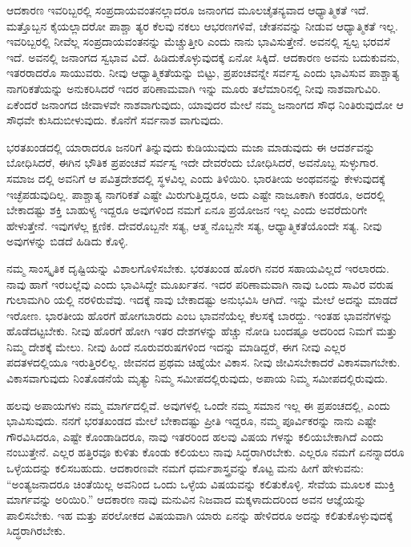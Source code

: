 ಆದಕಾರಣ ಇವರಿಬ್ಬರಲ್ಲಿ ಸಂಪ್ರದಾಯವಂತನಲ್ಲಾದರೂ ಜನಾಂಗದ ಮೂಲಚೈತನ್ಯವಾದ ಆಧ್ಯಾತ್ಮಿಕತೆ ಇದೆ. ಮತ್ತೊಬ್ಬನ ಕೈಯಲ್ಲಾದರೋ ಪಾಶ್ಚಾ ತ್ಯರ ಕೆಲವು ನಕಲು ಆಭರಣಗಳಿವೆ, ಚೇತನವನ್ನು ನೀಡುವ ಆಧ್ಯಾತ್ಮಿಕತೆ ಇಲ್ಲ. ಇವರಿಬ್ಬರಲ್ಲಿ ನೀವೆಲ್ಲ ಸಂಪ್ರದಾಯವಂತನನ್ನು ಮೆಚ್ಚುತ್ತೀರಿ ಎಂದು ನಾನು ಭಾವಿಸುತ್ತೇನೆ. ಅವನಲ್ಲಿ ಸ್ವಲ್ಪ ಭರವಸೆ ಇದೆ. ಅವನಲ್ಲಿ ಜನಾಂಗದ ಸ್ವಭಾವ ವಿದೆ. ಹಿಡಿದುಕೊಳ್ಳುವುದಕ್ಕೆ ಏನೋ ಸಿಕ್ಕಿದೆ. ಆದಕಾರಣ ಅವನು ಬದುಕುವನು, ಇತರರಾದರೊ ಸಾಯುವರು. ನೀವು ಆಧ್ಯಾತ್ಮಿಕತೆಯನ್ನು ಬಿಟ್ಟು, ಪ್ರಪಂಚವನ್ನೇ ಸರ್ವಸ್ವ ಎಂದು ಭಾವಿಸುವ ಪಾಶ್ಚಾತ್ಯ ನಾಗರಿಕತೆಯನ್ನು ಅನುಕರಿಸಿದರೆ ಇದರ ಪರಿಣಾಮವಾಗಿ ಇನ್ನು ಮೂರು ತಲೆಮಾರಿನಲ್ಲಿ ನೀವು ನಾಶವಾಗುವಿರಿ. ಏಕೆಂದರೆ ಜನಾಂಗದ ಜೀವಾಳವೇ ನಾಶವಾಗುವುದು, ಯಾವುದರ ಮೇಲೆ ನಮ್ಮ ಜನಾಂಗದ ಸೌಧ ನಿಂತಿರುವುದೋ ಆ ಸೌಧವೇ ಕುಸಿದುಬೀಳುವುದು. ಕೊನೆಗೆ ಸರ್ವನಾಶ ವಾಗುವುದು.

ಭರತಖಂಡದಲ್ಲಿ ಯಾರಾದರೂ ಜನರಿಗೆ ತಿನ್ನುವುದು ಕುಡಿಯುವುದು ಮಜಾ ಮಾಡುವುದು ಈ ಆದರ್ಶವನ್ನು ಬೋಧಿಸಿದರೆ, ಈಗಿನ ಭೌತಿಕ ಪ್ರಪಂಚವೆ ಸರ್ವಸ್ವ ಇದೇ ದೇವರೆಂದು ಬೋಧಿಸಿದರೆ, ಅವನೊಬ್ಬ ಸುಳ್ಳುಗಾರ. ಸಮಾಜ ದಲ್ಲಿ ಅವನಿಗೆ ಆ ಪವಿತ್ರದೇಶದಲ್ಲಿ ಸ್ಥಳವಿಲ್ಲ ಎಂದು ತಿಳಿಯಿರಿ. ಭಾರತೀಯ ಅಂಥವನನ್ನು ಕೇಳುವುದಕ್ಕೆ ಇಚ್ಛೆಪಡುವುದಿಲ್ಲ. ಪಾಶ್ಚಾತ್ಯ ನಾಗರಿಕತೆ ಎಷ್ಟೇ ಮಿರುಗುತ್ತಿದ್ದರೂ, ಅದು ಎಷ್ಟೇ ನಾಜೂಕಾಗಿ ಕಂಡರೂ, ಅದರಲ್ಲಿ ಬೇಕಾದಷ್ಟು ಶಕ್ತಿ ಬಾಹುಳ್ಯ ಇದ್ದರೂ ಅವುಗಳಿಂದ ನಮಗೆ ಏನೂ ಪ್ರಯೋಜನ ಇಲ್ಲ ಎಂದು ಅವರೆದುರಿಗೇ ಹೇಳುತ್ತೇನೆ. ಇವುಗಳೆಲ್ಲ ಕ್ಷಣಿಕ. ದೇವರೊಬ್ಬನೇ ಸತ್ಯ, ಆತ್ಮ ನೊಬ್ಬನೇ ಸತ್ಯ, ಆಧ್ಯಾತ್ಮಿಕತೆಯೊಂದೇ ಸತ್ಯ. ನೀವು ಅವುಗಳನ್ನು ಬಿಡದೆ ಹಿಡಿದು ಕೊಳ್ಳಿ.

ನಮ್ಮ ಸಾಂಸ್ಕೃತಿಕ ದೃಷ್ಟಿಯನ್ನು ವಿಶಾಲಗೊಳಿಸಬೇಕು. ಭರತಖಂಡ ಹೊರಗಿ ನವರ ಸಹಾಯವಿಲ್ಲದೆ ಇರಲಾರದು. ನಾವು ಹಾಗೆ ಇರಬಲ್ಲೆವು ಎಂದು ಭಾವಿಸಿದ್ದೇ ಮೂರ್ಖತನ. ಇದರ ಪರಿಣಾಮವಾಗಿ ನಾವು ಒಂದು ಸಾವಿರ ವರುಷ ಗುಲಾಮಗಿರಿ ಯಲ್ಲಿ ನರಳಿರುವೆವು. ಇದಕ್ಕೆ ನಾವು ಬೇಕಾದಷ್ಟು ಅನುಭವಿಸಿ ಆಗಿದೆ. ಇನ್ನು ಮೇಲೆ ಅದನ್ನು ಮಾಡದೆ ಇರೋಣ. ಭಾರತೀಯ ಹೊರಗೆ ಹೋಗಬಾರದು ಎಂಬ ಭಾವನೆಯೆಲ್ಲ ಕೆಲಸಕ್ಕೆ ಬಾರದ್ದು. ಇಂತಹ ಭಾವನೆಗಳನ್ನು ಹೊಡೆದಟ್ಟಬೇಕು. ನೀವು ಹೊರಗೆ ಹೋಗಿ ಇತರ ದೇಶಗಳನ್ನು ಹೆಚ್ಚು ನೋಡಿ ಬಂದಷ್ಟೂ ಅದರಿಂದ ನಿಮಗೆ ಮತ್ತು ನಿಮ್ಮ ದೇಶಕ್ಕೆ ಮೇಲು. ನೀವು ಹಿಂದೆ ನೂರುವರುಷಗಳಿಂದ ಇದನ್ನು ಮಾಡಿದ್ದರೆ, ಈಗ ನೀವು ಎಲ್ಲರ ಪದತಳದಲ್ಲಿಯೂ ಇರುತ್ತಿರಲಿಲ್ಲ. ಜೀವನದ ಪ್ರಥಮ ಚಿಹ್ನೆಯೇ ವಿಕಾಸ. ನೀವು ಜೀವಿಸಬೇಕಾದರೆ ವಿಕಾಸವಾಗಬೇಕು. ವಿಕಾಸವಾಗುವುದು ನಿಂತೊಡನೆಯೆ ಮೃತ್ಯು ನಿಮ್ಮ ಸಮೀಪದಲ್ಲಿರುವುದು, ಅಪಾಯ ನಿಮ್ಮ ಸಮೀಪದಲ್ಲಿರುವುದು.

ಹಲವು ಅಪಾಯಗಳು ನಮ್ಮ ಮಾರ್ಗದಲ್ಲಿವೆ. ಅವುಗಳಲ್ಲಿ ಒಂದೇ ನಮ್ಮ ಸಮಾನ ಇಲ್ಲ ಈ ಪ್ರಪಂಚದಲ್ಲಿ, ಎಂದು ಭಾವಿಸುವುದು. ನನಗೆ ಭರತಖಂಡದ ಮೇಲೆ ಬೇಕಾದಷ್ಟು ಪ್ರೀತಿ ಇದ್ದರೂ, ನಮ್ಮ ಪೂರ್ವಿಕರನ್ನು ನಾನು ಎಷ್ಟೇ ಗೌರವಿಸಿದರೂ, ಎಷ್ಟೇ ಕೊಂಡಾಡಿದರೂ, ನಾವು ಇತರರಿಂದ ಹಲವು ವಿಷಯ ಗಳನ್ನು ಕಲಿಯಬೇಕಾಗಿದೆ ಎಂದು ನಂಬುತ್ತೇನೆ. ಎಲ್ಲರ ಹತ್ತಿರವೂ ಕುಳಿತು ಕೊಂಡು ಕಲಿಯಲು ನಾವು ಸಿದ್ಧರಾಗಿರಬೇಕು. ಎಲ್ಲರೂ ನಮಗೆ ಏನನ್ನಾದರೂ ಒಳ್ಳೆಯದನ್ನು ಕಲಿಸಬಹುದು. ಆದಕಾರಣವೇ ನಮಗೆ ಧರ್ಮಶಾಸ್ತ್ರವನ್ನು ಕೊಟ್ಟ ಮನು ಹೀಗೆ ಹೇಳುವನು: “ಅಂತ್ಯಜನಾದರೂ ಚಿಂತೆಯಿಲ್ಲ ಅವನಿಂದ ಒಂದು ಒಳ್ಳೆಯ ವಿಷಯವನ್ನು ಕಲಿತುಕೊಳ್ಳಿ. ಸೇವೆಯ ಮೂಲಕ ಮುಕ್ತಿ ಮಾರ್ಗವನ್ನು ಅರಿಯಿರಿ.” ಆದಕಾರಣ ನಾವು ಮನುವಿನ ನಿಜವಾದ ಮಕ್ಕಳಾದುದರಿಂದ ಅವನ ಆಜ್ಞೆಯನ್ನು ಪಾಲಿಸಬೇಕು. ಇಹ ಮತ್ತು ಪರಲೋಕದ ವಿಷಯವಾಗಿ ಯಾರು ಏನನ್ನು ಹೇಳಿದರೂ ಅದನ್ನು ಕಲಿತುಕೊಳ್ಳುವುದಕ್ಕೆ ಸಿದ್ಧರಾಗಿರಬೇಕು.

